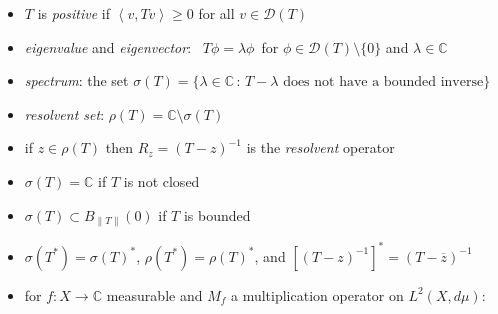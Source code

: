 \documentclass[11pt]{article}
\newcommand{\cD}{\mathcal{D}}
\newcommand{\CC}{\mathbb{C}}
\newcommand{\ip}[2]{\left<#1,#2\right>}
\begin{document}
\begin{itemize}[leftmargin=10mm,itemsep=0mm]
\item[\df{47}] $T$ is \emph{positive} if $\ip{v}{Tv}\ge 0$ for all $v\in\cD(T)$
\item[\df{67}] \emph{eigenvalue} and \emph{eigenvector}: \, $T\phi=\lambda\phi$ \,for $\phi\in\cD(T)\setminus\{0\}$ and $\lambda\in\CC$
\item[\df{68}] \emph{spectrum}: the set $\sigma(T)=\{\lambda \in\CC\,:\,T - \lambda \text{ does not have a bounded inverse}\}$
\item[\df{68}] \emph{resolvent set}: $\rho(T) = \CC\setminus \sigma(T)$
\item[\df{68}] if $z\in\rho(T)$ then $R_z = (T-z)^{-1}$ is the \emph{resolvent} operator
\item[\ft{68}] $\sigma(T)=\CC$ if $T$ is not closed
\item[\ft{69}] $\sigma(T) \subset B_{\|T\|}(0)$ if $T$ is bounded
\item[\ft{69}] $\sigma(T^*) = \sigma(T)^*$, $\rho(T^*)=\rho(T)^*$, and $\left[(T-z)^{-1}\right]^* = \left(T-\overline{z}\right)^{-1}$
\item[\ft{71}] for  $f:X\to\CC$ measurable and $M_f$ a multiplication operator on $L^2(X,d\mu)$:


\end{itemize}
\end{document}
